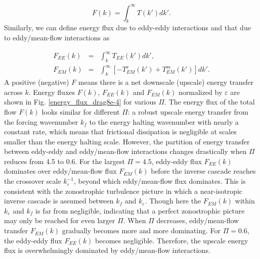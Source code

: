 \documentclass{ametsoc}
\begin{document}
\begin{equation}
F(k)=\int_{k}^{\infty}T(k')dk'.\label{eq:energy_flux}
\end{equation}
Similarly, we can define energy flux due to eddy-eddy interactions
and that due to eddy/mean-flow interactions as

\begin{eqnarray}
F_{EE}(k) & = & \int_{k}^{\infty}T_{EE}(k')dk',\label{eq:energy_flux_EE}\\
F_{EM}(k) & = & \int_{k}^{\infty}\left[-T_{EM}^{e}(k')+T_{EM}^{m}(k')\right]dk'.
\end{eqnarray}
A positive (negative) $F$ means there is a net downscale (upscale)
energy transfer across $k$. Energy fluxes $F(k)$, $F_{EE}(k)$ and
$F_{EM}(k)$ normalized by $\varepsilon$ are shown in Fig. \ref{energy_flux_drag8e-4}
for various $\Pi$. The energy flux of the total flow $F(k)$ looks
similar for different $\Pi$: a robust upscale energy transfer from
the forcing wavenumber $k_{f}$ to the energy halting wavenumber with
nearly a constant rate, which means that frictional dissipation is
negligible at scales smaller than the energy halting scale. However,
the partition of energy transfer between eddy-eddy and eddy/mean-flow
interactions changes drastically when $\Pi$ reduces from 4.5 to 0.6.
For the largest $\Pi=4.5$, eddy-eddy flux $F_{EE}(k)$ dominates
over eddy/mean-flow flux $F_{EM}(k)$ before the inverse cascade reaches
the crossover scale $k_{\varepsilon}^{-1}$, beyond which eddy/mean-flow
flux dominates. This is consistent with the zonostrophic turbulence
picture in which a near-isotropic inverse cascade is assumed between
$k_{f}$ and $k_{\varepsilon}$. Though here the $F_{EM}(k)$ within
$k_{\varepsilon}$ and $k_{f}$ is far from negligible, indicating
that a perfect zonostrophic picture may only be reached for even larger
$\Pi$. When $\Pi$ decreases, eddy/mean-flow transfer $F_{EM}(k)$
gradually becomes more and more dominating. For $\Pi=0.6$, the eddy-eddy
flux $F_{EE}(k)$ becomes negligible. Therefore, the upscale energy
flux is overwhelmingly dominated by eddy/mean-flow interactions.
\end{document}
